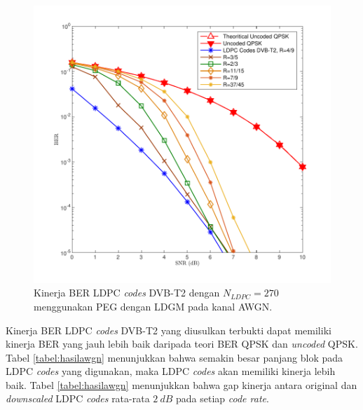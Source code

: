 \begin{figure}[b!]
	\centering
	\includegraphics[width=1\textwidth]
	{hasilpegawgnfixLDGM.pdf}
	\caption{Kinerja BER LDPC \textit{codes} DVB-T2 dengan $N_{LDPC}=270$ menggunakan PEG dengan LDGM pada kanal AWGN.}
	\label{fig:pegldgm}
\end{figure}

Kinerja BER LDPC \textit{codes} DVB-T2 yang diusulkan terbukti dapat memiliki kinerja BER yang jauh lebih baik daripada teori BER QPSK dan \textit{uncoded} QPSK.
 Tabel \ref{tabel:hasilawgn} menunjukkan bahwa semakin besar panjang blok pada LDPC \textit{codes} yang digunakan, maka LDPC \textit{codes} akan memiliki kinerja lebih baik. Tabel \ref{tabel:hasilawgn}  menunjukkan bahwa gap kinerja antara original dan \textit{downscaled} LDPC \textit{codes} rata-rata $2~dB$ pada setiap \textit{code rate}.

